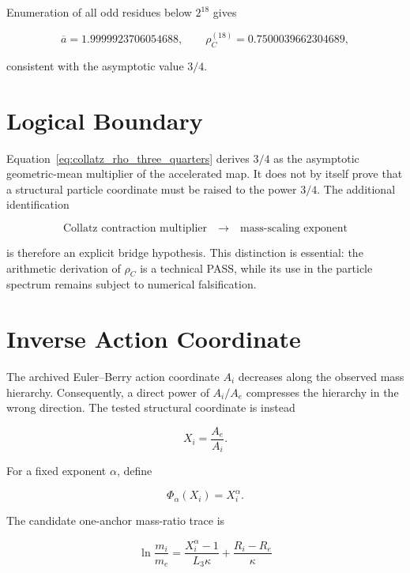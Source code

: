 Enumeration of all odd residues below $2^{18}$ gives

\begin{equation}
\overline{a}=1.9999923706054688,
\qquad
\rho_C^{(18)}=0.7500039662304689,
\end{equation}

consistent with the asymptotic value $3/4$.

\section{Logical Boundary}

Equation~\eqref{eq:collatz_rho_three_quarters} derives $3/4$ as the
asymptotic geometric-mean multiplier of the accelerated map.  It does not by
itself prove that a structural particle coordinate must be raised to the
power $3/4$.  The additional identification

\begin{equation}
\text{Collatz contraction multiplier}
\quad\longrightarrow\quad
\text{mass-scaling exponent}
\end{equation}

is therefore an explicit bridge hypothesis.  This distinction is essential:
the arithmetic derivation of $\rho_C$ is a technical PASS, while its use in
the particle spectrum remains subject to numerical falsification.

\section{Inverse Action Coordinate}

The archived Euler--Berry action coordinate $A_i$ decreases along the observed
mass hierarchy.  Consequently, a direct power of $A_i/A_e$ compresses the
hierarchy in the wrong direction.  The tested structural coordinate is
instead

\begin{equation}
X_i=\frac{A_e}{A_i}.
\label{eq:inverse_eb_action_coordinate}
\end{equation}

For a fixed exponent $\alpha$, define

\begin{equation}
\Phi_\alpha(X_i)=X_i^\alpha.
\end{equation}

The candidate one-anchor mass-ratio trace is

\begin{equation}
\boxed{
\ln\frac{m_i}{m_e}
=
\frac{X_i^\alpha-1}{L_3\kappa}
+
\frac{R_i-R_e}{\kappa}
}
\label{eq:quarter_power_mass_trace}
\end{equation}


